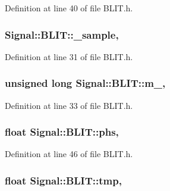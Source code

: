 Definition at line 40 of file B\+L\+I\+T.\+h.

\hypertarget{class_signal_1_1_b_l_i_t_a627f58926f503669eb676d0f3fd90501}{
\subsubsection[{\+\_\+sample}]{ Signal\+::\+B\+L\+I\+T\+::\+\_\+sample\hspace{0.3cm}{\ttfamily [protected]}, {\ttfamily [inherited]}}}\label{class_signal_1_1_b_l_i_t_a627f58926f503669eb676d0f3fd90501}


Definition at line 31 of file B\+L\+I\+T.\+h.

\hypertarget{class_signal_1_1_b_l_i_t_a8433b0437335d7834f17e4fa975ace1a}{
\subsubsection[{m\+\_\+}]{\setlength{\rightskip}{0pt plus 5cm}unsigned long Signal\+::\+B\+L\+I\+T\+::m\+\_\+\hspace{0.3cm}{\ttfamily [protected]}, {\ttfamily [inherited]}}}\label{class_signal_1_1_b_l_i_t_a8433b0437335d7834f17e4fa975ace1a}


Definition at line 33 of file B\+L\+I\+T.\+h.

\hypertarget{class_signal_1_1_b_l_i_t_ab43c19874ddb53d92ba7e3374ce94b33}{
\subsubsection[{phs}]{\setlength{\rightskip}{0pt plus 5cm}float Signal\+::\+B\+L\+I\+T\+::phs\hspace{0.3cm}{\ttfamily [protected]}, {\ttfamily [inherited]}}}\label{class_signal_1_1_b_l_i_t_ab43c19874ddb53d92ba7e3374ce94b33}


Definition at line 46 of file B\+L\+I\+T.\+h.

\hypertarget{class_signal_1_1_b_l_i_t_aad33fcad866b50f9596d7b54eef4f27a}{
\subsubsection[{tmp}]{\setlength{\rightskip}{0pt plus 5cm}float Signal\+::\+B\+L\+I\+T\+::tmp\hspace{0.3cm}{\ttfamily [protected]}, {\ttfamily [inherited]}}}\label{class_signal_1_1_b_l_i_t_aad33fcad866b50f9596d7b54eef4f27a}


